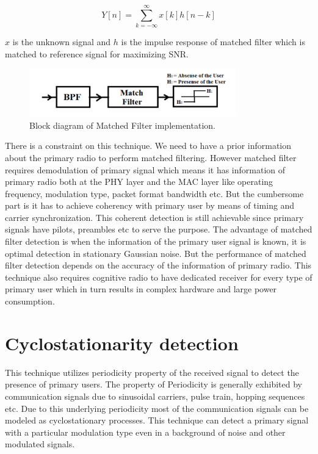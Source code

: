 \begin{equation*}
Y[n] = \sum_{k=-\infty}^{\infty}x[k]h[n-k]
\end{equation*}

$x$ is the unknown signal and $h$ is the impulse response of matched filter which is 
matched to reference signal for maximizing SNR. 

\begin{figure}[h]
\centering
\includegraphics[width=0.8\textwidth]{../images/matchedFilter}
\caption[Matched Filter implementation]{Block diagram 
of Matched Filter implementation.}
\label{matchedFilter}
\end{figure}

There is a constraint on this technique. We need to have a prior information 
about the primary radio to perform matched filtering. However matched filter 
requires demodulation of primary signal which means it has information of 
primary radio both at the PHY layer and the MAC layer like operating frequency, 
modulation type, packet format bandwidth etc. But the cumbersome part is it has 
to achieve coherency with primary user by means of timing and carrier 
synchronization. This coherent detection is still achievable since primary 
signals have pilots, preambles etc to serve the purpose. 
The advantage of matched filter detection is when the information of the primary
user signal is known, it is optimal detection in stationary Gaussian noise. But 
the performance of matched filter detection depends on the accuracy of the 
information of primary radio. This technique also requires cognitive radio to 
have dedicated receiver for every type of primary user which in turn results in 
complex hardware and large power consumption\cite{mansi11}.

\section{Cyclostationarity detection}

This technique utilizes periodicity property of the received signal to detect 
the
presence of primary users. The property of Periodicity is generally exhibited by 
communication signals due to sinusoidal carriers, pulse train, hopping sequences
etc. Due to this underlying periodicity most of the communication signals can be
modeled as cyclostationary processes. This 
technique can detect a primary signal with a particular modulation type even in a
background of noise and other modulated signals.

